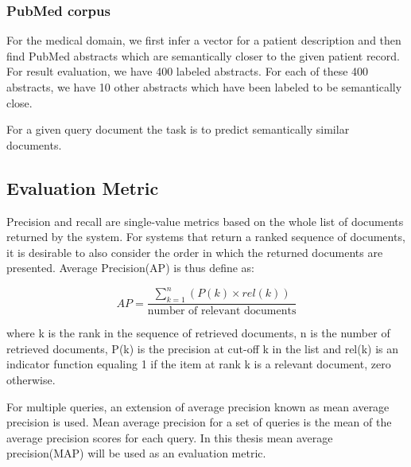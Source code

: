 \documentclass[12pt,a4paper] {article}
\begin{document}
	\subsubsection*{PubMed corpus}
	
	For the medical domain, we first infer a vector for a patient description and then find PubMed abstracts which are semantically closer to the given patient record.
	For result evaluation, we have 400 labeled abstracts. For each of these 400 abstracts, we have 10 other abstracts which have been labeled to be semantically close. 
	
	For a given query document the task is to predict semantically similar documents.
	
	
	
	\subsection*{Evaluation Metric}
	Precision and recall are single-value metrics based on the whole list of documents returned by the system. For systems that return a ranked sequence of documents, it is desirable to also consider the order in which the returned documents are presented. Average Precision(AP) is thus define as:
	
	\begin{equation}
	AP =\frac {\sum_{k=1}^{n}(P(k)\times rel (k))}{\mbox {number of relevant documents}}
	\end{equation}
	
	where k is the rank in the sequence of retrieved documents,  n is the number of retrieved documents,  P(k) is the precision at cut-off k in the list and rel(k) is an indicator function equaling 1 if the item at rank k is a relevant document, zero otherwise.
	
	For multiple queries, an extension of average precision known as mean average precision is used. Mean average precision for a set of queries is the mean of the average precision scores for each query. In this thesis mean average precision(MAP) will be used as an evaluation metric.
	
	
	 
	
\end{document}
